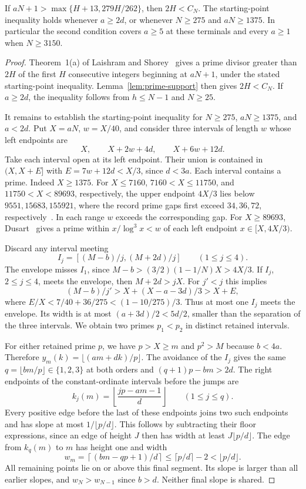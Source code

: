 \begin{lemma}
\label{lem:degree-cap}
If \(aN+1>\max\{H+13,279H/262\}\), then \(2H<C_N\).
The starting-point inequality holds whenever \(a\ge2d\), or
whenever \(N\ge275\) and \(aN\ge1375\). In particular the second
condition covers \(a\ge5\) at these terminals and every \(a\ge1\)
when \(N\ge3150\).
\end{lemma}

\begin{proof}
Theorem~1(a) of Laishram and Shorey~\cite{laishram-shorey} gives a prime
divisor greater than \(2H\) of the first \(H\) consecutive integers
beginning at \(aN+1\), under the stated starting-point inequality.
Lemma~\ref{lem:prime-support} then gives \(2H<C_N\).
If \(a\ge2d\), the inequality follows from \(h\le N-1\) and \(N\ge25\).

It remains to establish the starting-point inequality for
\(N\ge275\), \(aN\ge1375\), and \(a<2d\).
Put \(X=aN\), \(w=X/40\), and consider
three intervals of length \(w\) whose left endpoints are
\[
 X,\qquad X+2w+4d,\qquad X+6w+12d.
\]
Take each interval open at its left endpoint. Their union is contained
in \((X,X+E]\) with \(E=7w+12d< X/3\), since \(d<3a\).
Each interval contains a prime. Indeed \(X\ge1375\). For
\(X\le7160\), \(7160<X\le11750\), and \(11750<X<89693\), respectively,
the upper endpoint \(4X/3\) lies below \(9551,15683,155921\),
where the record prime gaps first exceed \(34,36,72\),
respectively~\cite[Table~8]{oliveira-gaps}. In each range \(w\)
exceeds the corresponding gap. For \(X\ge89693\),
Dusart~\cite[Proposition~5.4]{dusart-interval} gives a prime within
\(x/\log^3x<w\) of each left endpoint \(x\in[X,4X/3)\).

Discard any interval meeting
\[
 I_j=[(M-b)/j,(M+2d)/j]\qquad(1\le j\le4).
\]
The envelope misses \(I_1\), since \(M-b>(3/2)(1-1/N)X>4X/3\).
If \(I_j\), \(2\le j\le4\), meets the envelope, then \(M+2d>jX\).
For \(j'<j\) this implies
\[
 (M-b)/j' > X+(X-a-3d)/3>X+E,
\]
where \(E/X<7/40+36/275 < (1-10/275)/3\).
Thus at most one \(I_j\) meets the envelope. Its width is
at most \((a+3d)/2<5d/2\), smaller than the separation of the
three intervals. We obtain two primes \(p_1<p_2\) in distinct
retained intervals.

For either retained prime \(p\), we have \(p>X\ge m\) and
\(p^2>M\) because \(b<4a\). Therefore
\(y_m(k)=\lfloor(am+dk)/p\rfloor\). The avoidance of the \(I_j\)
gives the same \(q=\lfloor bm/p\rfloor\in\{1,2,3\}\) at both orders
and \((q+1)p-bm>2d\). The right endpoints of the constant-ordinate
intervals before the jumps are
\[
 k_j(m)=\left\lfloor\frac{jp-am-1}{d}\right\rfloor
 \qquad(1\le j\le q).
\]
Every positive edge before the last of these endpoints joins two such
endpoints and has slope at most \(1/\lfloor p/d\rfloor\).
This follows by subtracting their floor expressions, since an edge
of height \(J\) then has width at least \(J\lfloor p/d\rfloor\).
The edge from \(k_q(m)\) to \(m\) has height one and width
\[
 w_m=\left\lceil(bm-qp+1)/d\right\rceil
 \le \lceil p/d\rceil-2 <\lfloor p/d\rfloor.
\]
All remaining points lie on or above this final segment. Its slope
is larger than all earlier slopes, and \(w_N>w_{N-1}\) since \(b>d\).
Neither final slope is shared.


\end{proof}

